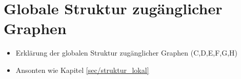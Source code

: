 \section{Globale Struktur zugänglicher Graphen}
\label{sec/struktur_global}

\begin{itemize}
	\item Erklärung der globalen Struktur zugänglicher Graphen (C,D,E,F,G,H)
	\item Ansonten wie Kapitel \ref{sec/struktur_lokal}
\end{itemize}